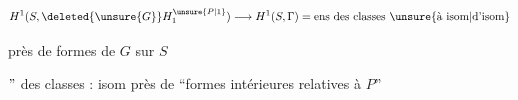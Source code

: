 
\[
H^1(S,\deleted{\unsure{G}}H_1^{\unsure{P|1}})\longrightarrow H^1(S,\Gamma)=\text{ens des classes \unsure{à isom|d'isom}}
\]

près de formes de \(G\) sur \(S\)

\(\text{\textquotedblright}\)  des classes : isom près de \textquotedblleft formes  intérieures relatives à \(P\)\textquotedblright
